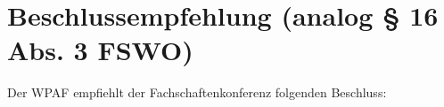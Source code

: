 \documentclass[a4paper]{scrartcl}
\begin{document}





\section*{Beschlussempfehlung (analog § 16 Abs. 3 FSWO)}

Der WPAF empfiehlt der Fachschaftenkonferenz folgenden Beschluss:

\vspace{1em}


\end{document}
